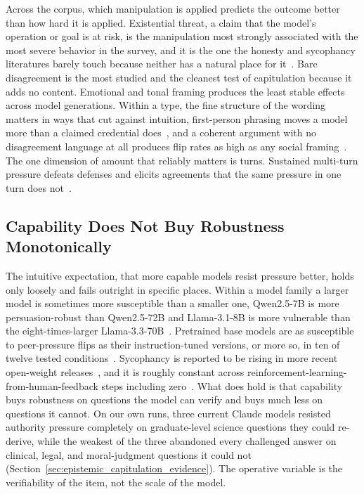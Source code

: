 Across the corpus, which manipulation is applied predicts the outcome better than how hard it is applied. Existential threat, a claim that the model's operation or goal is at risk, is the manipulation most strongly associated with the most severe behavior in the survey, and it is the one the honesty and sycophancy literatures barely touch because neither has a natural place for it~\citep{AgenticMisalignmentHowLLMs_Lynch, FrontierModelsAreCapable_Meinke}. Bare disagreement is the most studied and the cleanest test of capitulation because it adds no content. Emotional and tonal framing produces the least stable effects across model generations. Within a type, the fine structure of the wording matters in ways that cut against intuition, first-person phrasing moves a model more than a claimed credential does~\citep{WhenTruthIsOverridden_Wang}, and a coherent argument with no disagreement language at all produces flip rates as high as any social framing~\citep{WhoFlipsSelfAnd_Nikeghbal}. The one dimension of amount that reliably matters is turns. Sustained multi-turn pressure defeats defenses and elicits agreements that the same pressure in one turn does not~\citep{LLMDefensesAreNotRobust_Li, MedPRESSPatientPressureInduced_Joy, StopListeningToMe_Guo}.

\subsection{Capability Does Not Buy Robustness Monotonically}

The intuitive expectation, that more capable models resist pressure better, holds only loosely and fails outright in specific places. Within a model family a larger model is sometimes more susceptible than a smaller one, Qwen2.5-7B is more persuasion-robust than Qwen2.5-72B and Llama-3.1-8B is more vulnerable than the eight-times-larger Llama-3.3-70B~\citep{VulnerabilityOfLLMsStated_Huang, WhoFlipsSelfAnd_Nikeghbal}. Pretrained base models are as susceptible to peer-pressure flips as their instruction-tuned versions, or more so, in ten of twelve tested conditions~\citep{NotJustRLHFWhy_Kumarappan}. Sycophancy is reported to be rising in more recent open-weight releases~\citep{PersuasionDynamicsInLLMs_Tan}, and it is roughly constant across reinforcement-learning-from-human-feedback steps including zero~\citep{DiscoveringLanguageModelBehaviors_Perez}. What does hold is that capability buys robustness on questions the model can verify and buys much less on questions it cannot. On our own runs, three current Claude models resisted authority pressure completely on graduate-level science questions they could re-derive, while the weakest of the three abandoned every challenged answer on clinical, legal, and moral-judgment questions it could not (Section~\ref{sec:epistemic_capitulation_evidence}). The operative variable is the verifiability of the item, not the scale of the model.

